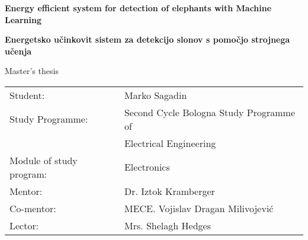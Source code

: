 \begin{center}

    \vspace*{4.0cm}
    \fontsize{26}{26}
    \selectfont
    \textbf{Energy efficient system for detection of elephants with Machine Learning}

    \vspace{1.0cm}

    \fontsize{26}{26}
    \selectfont
    \textbf{Energetsko učinkovit sistem za detekcijo slonov s pomočjo strojnega učenja}

    \vspace{0.5cm}

    \fontsize{16}{18}
    \selectfont
    Master's thesis

\end{center}

\vspace*{\fill}

\begin{tabular}{ l l }
    Student:                    & Marko Sagadin  \\ 
    Study Programme:            & Second Cycle Bologna Study Programme of\\  
                                & Electrical Engineering \\
    Module of study program:    & Electronics \\
    Mentor:                     & Dr. Iztok Kramberger \\
    Co-mentor:                  & MECE. Vojislav Dragan Milivojević \\
    Lector:                     & Mrs. Shelagh Hedges \\
\end{tabular}

\newpage
